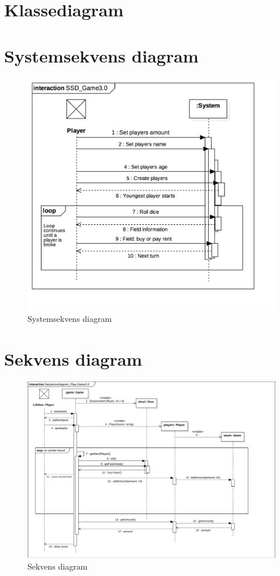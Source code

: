 \pagebreak

\section{Klassediagram}

\pagebreak

\section{Systemsekvens diagram}
\begin{figure}[H]
    \begin{center}
        \includegraphics[width=\columnwidth]{graphics/domain/SSD_Game3.png}
        \caption{Systemsekvens diagram}
        \label{fig:systemsekvens_diagram}
    \end{center}
\end{figure}

\section{Sekvens diagram}
\begin{figure}[H]
    \begin{center}
        \includegraphics[width=\columnwidth]{graphics/domain/SD_Game3.png}
        \caption{Sekvens diagram}
        \label{fig:sekvens_diagram}
    \end{center}
\end{figure}